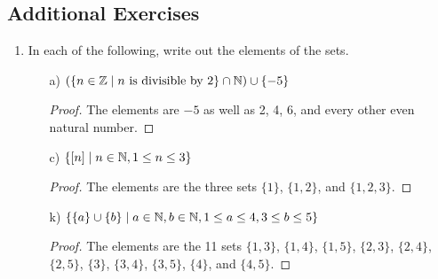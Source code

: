 \documentclass[../main.tex]{subfiles}
\begin{document}
\subsection*{Additional Exercises}
\begin{enumerate}
    \item {}In each of the following, write out the elements of the sets.
    \begin{enumerate}
        \item[a)] $(\{n\in\mathbb{Z}\mid n\text{ is divisible by }2\}\cap\mathbb{N})\cup\{-5\}$
        \begin{proof}
            The elements are $-5$ as well as 2, 4, 6, and every other even natural number.
        \end{proof}
        \item[c)] $\{[n]\mid n\in\mathbb{N},1\leq n\leq 3\}$
        \begin{proof}
            The elements are the three sets $\{1\}$, $\{1,2\}$, and $\{1,2,3\}$.
        \end{proof}
        \item[k)] $\{\{a\}\cup\{b\}\mid a\in\mathbb{N},b\in\mathbb{N},1\leq a\leq 4,3\leq b\leq 5\}$
        \begin{proof}
            The elements are the 11 sets $\{1,3\}$, $\{1,4\}$, $\{1,5\}$, $\{2,3\}$, $\{2,4\}$, $\{2,5\}$, $\{3\}$, $\{3,4\}$, $\{3,5\}$, $\{4\}$, and $\{4,5\}$.
        \end{proof}
    \end{enumerate}
\end{enumerate}
\end{document}

